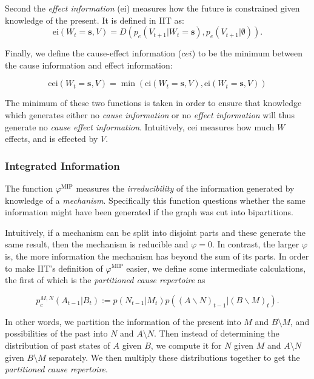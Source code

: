 Second the \textit{effect information} (ei) measures how the future is constrained given knowledge of the present. It is defined in IIT \cite{oizumi2014phenomenology} as:
\begin{equation}
\label{def:ei}
\text{ei}(W_{t} = \mathbf{s}, V) = D\left(p_e(V_{t+1}|W_{t} = \mathbf{s}),p_{e}(V_{t+1}|\emptyset)\right).
\end{equation}

Finally, we define the cause-effect information ($cei$) to be the minimum between the cause information and effect information:

\begin{equation}
\label{def:cei}
\text{cei}(W_{t} = \mathbf{s}, V) = \min\left(\text{ci}(W_{t} = \mathbf{s}, V), \text{ei}(W_{t} = \mathbf{s}, V) \right)
\end{equation}

The minimum of these two functions is taken in order to ensure that knowledge which generates either no \textit{cause information} or no \textit{effect information} will thus generate no \textit{cause effect information}. Intuitively, cei measures how much $W$ effects, and is effected by $V$.

\subsubsection{Integrated Information}
\label{sec:mech_integration}
The function $\varphi^{\text{MIP}}$ measures the \textit{irreducibility} of the information generated by knowledge of a \textit{mechanism}. Specifically this function questions whether the same information might have been generated if the graph was cut into bipartitions. 

Intuitively, if a mechanism can be split into disjoint parts and these generate the same result, then the mechanism is reducible and $\varphi=0$. In contrast, the larger $\varphi$ is, the more information the mechanism has beyond the sum of its parts. In order to make IIT's definition of $\varphi^{\text{MIP}}$ easier, we define some intermediate calculations, the first of which is the \textit{partitioned cause repertoire} as

\begin{equation}
\label{def:preMIP}
p_c^{M,N}(A_{t-1}|B_t ):= p(N_{t-1}|M_t) p((A \backslash N)_{t-1} |(B \backslash M)_t).
\end{equation}

In other words, we partition the information of the present into $M$ and $B\setminus M$, and possibilities of the past into $N$ and $A \setminus N$. Then instead of determining the distribution of past states of $A$ given $B$, we compute it for $N$ given $M$ and $A\setminus N$ given $B \setminus M$ separately. We then multiply these distributions together to get the \textit{partitioned cause repertoire}.

